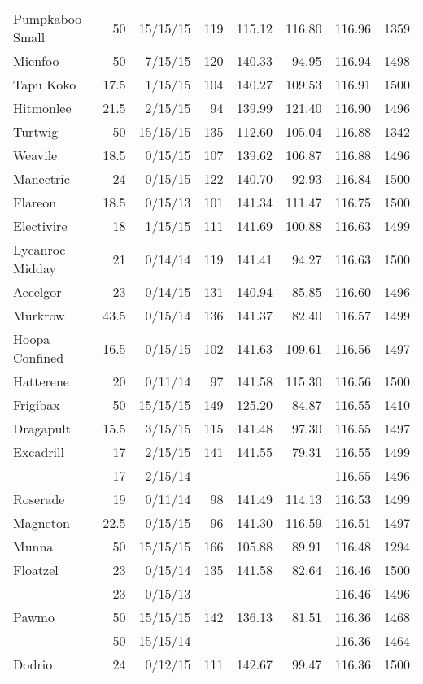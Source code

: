 \begin{longtable}{lrrrrrrr}
Pumpkaboo Small & 50 & 15/15/15 & 119 & 115.12 & 116.80 & 116.96 & 1359\\
Mienfoo & 50 & 7/15/15 & 120 & 140.33 & 94.95 & 116.94 & 1498\\
Tapu Koko & 17.5 & 1/15/15 & 104 & 140.27 & 109.53 & 116.91 & 1500\\
Hitmonlee & 21.5 & 2/15/15 & 94 & 139.99 & 121.40 & 116.90 & 1496\\
Turtwig & 50 & 15/15/15 & 135 & 112.60 & 105.04 & 116.88 & 1342\\
Weavile & 18.5 & 0/15/15 & 107 & 139.62 & 106.87 & 116.88 & 1496\\
Manectric & 24 & 0/15/15 & 122 & 140.70 & 92.93 & 116.84 & 1500\\
Flareon & 18.5 & 0/15/13 & 101 & 141.34 & 111.47 & 116.75 & 1500\\
Electivire & 18 & 1/15/15 & 111 & 141.69 & 100.88 & 116.63 & 1499\\
Lycanroc Midday & 21 & 0/14/14 & 119 & 141.41 & 94.27 & 116.63 & 1500\\
Accelgor & 23 & 0/14/15 & 131 & 140.94 & 85.85 & 116.60 & 1496\\
Murkrow & 43.5 & 0/15/14 & 136 & 141.37 & 82.40 & 116.57 & 1499\\
Hoopa Confined & 16.5 & 0/15/15 & 102 & 141.63 & 109.61 & 116.56 & 1497\\
Hatterene & 20 & 0/11/14 & 97 & 141.58 & 115.30 & 116.56 & 1500\\
Frigibax & 50 & 15/15/15 & 149 & 125.20 & 84.87 & 116.55 & 1410\\
Dragapult & 15.5 & 3/15/15 & 115 & 141.48 & 97.30 & 116.55 & 1497\\
Excadrill & 17 & 2/15/15 & 141 & 141.55 & 79.31 & 116.55 & 1499\\
 & 17 & 2/15/14 & & & & 116.55 & 1496\\
Roserade & 19 & 0/11/14 & 98 & 141.49 & 114.13 & 116.53 & 1499\\
Magneton & 22.5 & 0/15/15 & 96 & 141.30 & 116.59 & 116.51 & 1497\\
Munna & 50 & 15/15/15 & 166 & 105.88 & 89.91 & 116.48 & 1294\\
Floatzel & 23 & 0/15/14 & 135 & 141.58 & 82.64 & 116.46 & 1500\\
 & 23 & 0/15/13 & & & & 116.46 & 1496\\
Pawmo & 50 & 15/15/15 & 142 & 136.13 & 81.51 & 116.36 & 1468\\
 & 50 & 15/15/14 & & & & 116.36 & 1464\\
Dodrio & 24 & 0/12/15 & 111 & 142.67 & 99.47 & 116.36 & 1500\\

\end{longtable}

